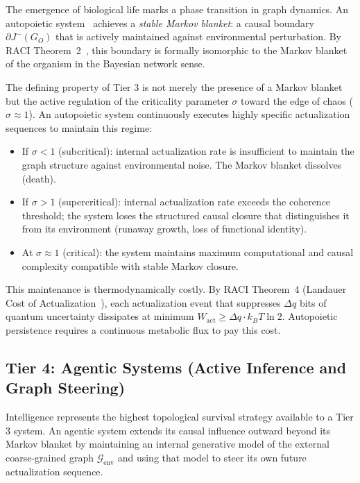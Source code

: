 \documentclass[11pt,a4paper]{article}
\theoremstyle{remark}
\newcommand{\GG}{\mathcal{G}}
\newcommand{\sigmaedge}{\sigma}
\begin{document}
The emergence of biological life marks a phase transition in graph dynamics. An
autopoietic system~\citep{Maturana1980} achieves a \emph{stable Markov blanket}:
a causal boundary $\partial J^-(G_O)$ that is actively maintained against
environmental perturbation. By RACI Theorem~2~\citep{Sandeman2026c}, this
boundary is formally isomorphic to the Markov blanket of the organism in the
Bayesian network sense.

The defining property of Tier 3 is not merely the presence of a Markov blanket
but the active regulation of the criticality parameter $\sigmaedge$ toward the
edge of chaos ($\sigmaedge \approx 1$). An autopoietic system continuously executes
highly specific actualization sequences to maintain this regime:
\begin{itemize}[noitemsep]
  \item If $\sigmaedge < 1$ (subcritical): internal actualization rate is insufficient
    to maintain the graph structure against environmental noise. The Markov blanket
    dissolves (death).
  \item If $\sigmaedge > 1$ (supercritical): internal actualization rate exceeds
    the coherence threshold; the system loses the structured causal closure that
    distinguishes it from its environment (runaway growth, loss of functional
    identity).
  \item At $\sigmaedge \approx 1$ (critical): the system maintains maximum
    computational and causal complexity compatible with stable Markov closure.
\end{itemize}

This maintenance is thermodynamically costly. By RACI Theorem~4 (Landauer Cost
of Actualization~\citep{Sandeman2026c}), each actualization event that suppresses
$\Delta q$ bits of quantum uncertainty dissipates at minimum
$W_{\mathrm{act}} \geq \Delta q \cdot k_BT \ln 2$. Autopoietic persistence
requires a continuous metabolic flux to pay this cost.

\subsection{Tier 4: Agentic Systems (Active Inference and Graph Steering)}

Intelligence represents the highest topological survival strategy available to a
Tier 3 system. An agentic system extends its causal influence outward beyond its
Markov blanket by maintaining an internal generative model of the external
coarse-grained graph $\GG_{\mathrm{env}}$ and using that model to steer its own
future actualization sequence.
\end{document}
